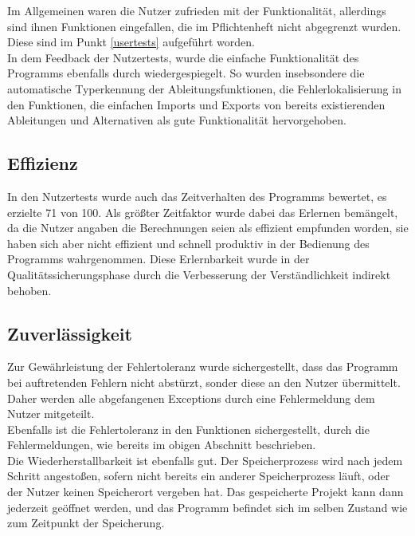 \documentclass{article}
\begin{document}
Im Allgemeinen waren die Nutzer zufrieden mit der Funktionalität, allerdings sind ihnen Funktionen eingefallen, die im Pflichtenheft nicht abgegrenzt wurden. Diese sind im Punkt \ref{usertests} aufgeführt worden.\\

In dem Feedback der Nutzertests, wurde die einfache Funktionalität des Programms ebenfalls durch wiedergespiegelt. So wurden insebsondere die automatische Typerkennung der Ableitungsfunktionen, die Fehlerlokalisierung in den Funktionen, die einfachen Imports und Exports von bereits existierenden Ableitungen und Alternativen als gute Funktionalität hervorgehoben.\\

\subsection{Effizienz}

In den Nutzertests wurde auch das Zeitverhalten des Programms bewertet, es erzielte 71 von 100. Als größter Zeitfaktor wurde dabei das Erlernen bemängelt, da die Nutzer angaben die Berechnungen seien als effizient empfunden worden, sie haben sich aber nicht effizient und schnell produktiv in der Bedienung des Programms wahrgenommen. Diese Erlernbarkeit wurde in der Qualitätssicherungsphase durch die Verbesserung der Verständlichkeit indirekt behoben.

\subsection{Zuverlässigkeit}

Zur Gewährleistung der Fehlertoleranz wurde sichergestellt, dass das Programm bei auftretenden Fehlern nicht abstürzt, sonder diese an den Nutzer übermittelt. Daher werden alle abgefangenen Exceptions durch eine Fehlermeldung dem Nutzer mitgeteilt.\\

Ebenfalls ist die Fehlertoleranz in den Funktionen sichergestellt, durch die Fehlermeldungen, wie bereits im obigen Abschnitt beschrieben.\\

Die Wiederherstallbarkeit ist ebenfalls gut. Der Speicherprozess wird nach jedem Schritt angestoßen, sofern nicht bereits ein anderer Speicherprozess läuft, oder der Nutzer keinen Speicherort vergeben hat. Das gespeicherte Projekt kann dann jederzeit geöffnet werden, und das Programm befindet sich im selben Zustand wie zum Zeitpunkt der Speicherung.\\
\end{document}
